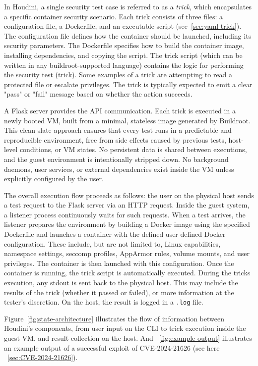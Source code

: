 \documentclass[12pt]{report}
\begin{document}
\begin{doublespace}
In Houdini, a single security test case is referred to as a \textit{trick}, which encapsulates a specific container security scenario. Each trick consists of three files: a configuration file, a Dockerfile, and an executable script (see~\ref{sec:yaml-trick}). The configuration file defines how the container should be launched, including its security parameters. The Dockerfile specifies how to build the container image, installing dependencies, and copying the script. The trick script (which can be written in any buildroot-supported language) contains the logic for performing the security test (trick). Some examples of a trick are attempting to read a protected file or escalate privileges. The trick is typically expected to emit a clear "pass" or "fail" message based on whether the action succeeds.

A Flask server provides the API communication. Each trick is executed in a newly booted VM, built from a minimal, stateless image generated by Buildroot. This clean-slate approach ensures that every test runs in a predictable and reproducible environment, free from side effects caused by previous tests, host-level conditions, or VM states. No persistent data is shared between executions, and the guest environment is intentionally stripped down. No background daemons, user services, or external dependencies exist inside the VM unless explicitly configured by the user.

The overall execution flow proceeds as follows: the user on the physical host sends a test request to the Flask server via an HTTP request. Inside the guest system, a listener process continuously waits for such requests. When a test arrives, the listener prepares the environment by building a Docker image using the specified Dockerfile and launches a container with the defined user-defined Docker configuration. These include, but are not limited to, Linux capabilities, namespace settings, seccomp profiles, AppArmor rules, volume mounts, and user privileges. The container is then launched with this configuration. Once the container is running, the trick script is automatically executed. During the tricks execution, any stdout is sent back to the physical host. This may include the results of the trick (whether it passed or failed), or more information at the tester's discretion. On the host, the result is logged in a \texttt{.log} file.

Figure~\ref{fig:state-architecture} illustrates the flow of information between Houdini's components, from user input on the CLI to trick execution inside the guest VM, and result collection on the host. And ~\ref{fig:example-output} illustrates an example output of a successful exploit of CVE-2024-21626 (see here ~\ref{sec:CVE-2024-21626}).



\end{doublespace}
\end{document}
